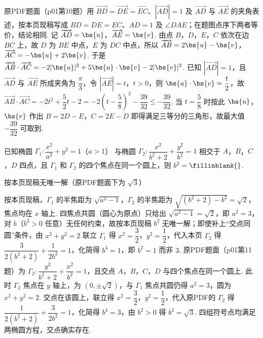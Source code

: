 \begin{solution}
原PDF题面（p01第10题）用 \(\overrightarrow{BD}=\overrightarrow{DE}=\overrightarrow{EC}\)、\(\left|\overrightarrow{AD}\right|=1\) 及 \(\overrightarrow{AD}\) 与 \(\overrightarrow{AE}\) 的夹角表述，按本页现稿写成 \(BD=DE=EC\)、\(AD=1\) 及 \(\angle DAE\)；在题图点序下两者等价，结论相同. 记 \(\overrightarrow{AD}=\bs{u}\)，\(\overrightarrow{AE}=\bs{v}\). 由点 \(B\)，\(D\)，\(E\)，\(C\) 依次在边 \(BC\) 上，故 \(D\) 为 \(BE\) 中点，\(E\) 为 \(DC\) 中点，所以 \(\overrightarrow{AB}=2\bs{u}-\bs{v}\)，\(\overrightarrow{AC}=-\bs{u}+2\bs{v}\). 于是 \(\overrightarrow{AB}\cdot\overrightarrow{AC}=-2|\bs{u}|^2+5\bs{u}\cdot\bs{v}-2|\bs{v}|^2\). 已知 \(|\overrightarrow{AD}|=1\)，且 \(\overrightarrow{AD}\) 与 \(\overrightarrow{AE}\) 所成夹角为 \(\dfrac{\pi}{3}\)，令 \(|\overrightarrow{AE}|=t\)，\(t>0\)，则 \(\bs{u}\cdot\bs{v}=\dfrac{t}{2}\)，故 \(\overrightarrow{AB}\cdot\overrightarrow{AC}=-2t^2+\dfrac52t-2=-2\left(t-\dfrac58\right)^2-\dfrac{39}{32}\le-\dfrac{39}{32}\). 当 \(t=\dfrac58\) 时按此 \(\bs{u}\)，\(\bs{v}\) 作出 \(B=2D-E\)，\(C=2E-D\) 即得满足三等分的三角形，故最大值 \(-\dfrac{39}{32}\) 可取到.
\end{solution}

\begin{problem}
已知椭圆 \(\Gamma_1:\dfrac{x^2}{a^2}+y^2=1\)（\(a>1\)） 与椭圆 \(\Gamma_2:\dfrac{x^2}{b^2+2}+\dfrac{y^2}{b^2}=1\) 相交于 \(A\)，\(B\)，\(C\)，\(D\) 四点，且 \(\Gamma_1\) 和 \(\Gamma_2\) 的四个焦点在同一个圆上，则 \(b^2=\fillinblank{}\).
\end{problem}

\begin{answer}
按本页现稿无唯一解（原PDF题面下为 \(\sqrt{3}\)）
\end{answer}

\begin{solution}
按本页现稿，\(\Gamma_1\) 的半焦距为 \(\sqrt{a^2-1}\)，\(\Gamma_2\) 的半焦距为 \(\sqrt{\left(b^2+2\right)-b^2}=\sqrt2\)，焦点均在 \(x\) 轴上. 四焦点共圆（圆心为原点）只给出 \(\sqrt{a^2-1}=\sqrt2\)，即 \(a^2=3\)，对 \(b\)（\(b^2>0\) 任意）无任何约束，故按本页现稿 \(b^2\) 无唯一解；即使补上“交点同圆”条件，由 \(x^2+y^2=2\) 联立 \(\Gamma_1\) 得 \(x^2=\dfrac32\)，\(y^2=\dfrac12\)，代入本页 \(\Gamma_2\) 得 \(\dfrac{3}{2\left(b^2+2\right)}+\dfrac{1}{2b^2}=1\)，化简得 \(b^4=1\)，即 \(b^2=1\) 而非 \(3\). 原PDF题面（p01第11题）为 \(\Gamma_2:\dfrac{y^2}{b^2+2}+\dfrac{x^2}{b^2}=1\)，且交点 \(A\)，\(B\)，\(C\)，\(D\) 与四个焦点在同一个圆上. 此时 \(\Gamma_2\) 焦点在 \(y\) 轴上，为 \(\left(0,\pm\sqrt2\right)\)，与 \(\Gamma_1\) 焦点共圆仍得 \(a^2=3\)，圆为 \(x^2+y^2=2\). 交点在该圆上，联立得 \(x^2=\dfrac32\)，\(y^2=\dfrac12\)，代入原PDF的 \(\Gamma_2\) 得 \(\dfrac{1}{2\left(b^2+2\right)}+\dfrac{3}{2b^2}=1\)，化简得 \(b^4=3\)，由 \(b^2>0\) 得 \(b^2=\sqrt{3}\). 四组符号点均满足两椭圆方程，交点确实存在.
\end{solution}

